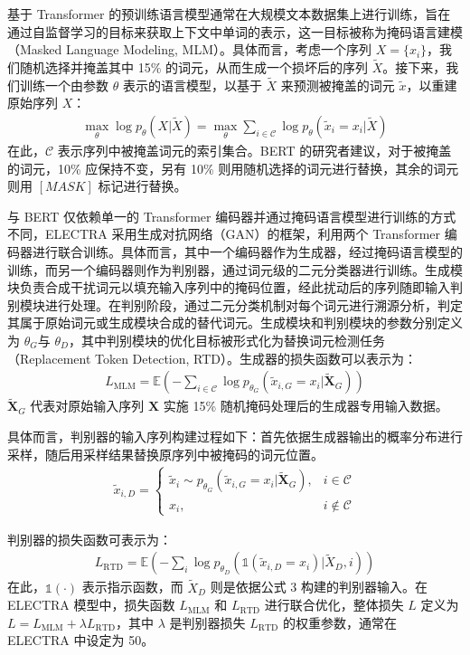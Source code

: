 基于 Transformer 的预训练语言模型通常在大规模文本数据集上进行训练，旨在通过自监督学习的目标来获取上下文中单词的表示，这一目标被称为掩码语言建模（Masked Language Modeling, MLM）\cite{devlin_bert_2019}。具体而言，考虑一个序列 \(X = \{x_i\}\)，我们随机选择并掩盖其中 15\% 的词元，从而生成一个损坏后的序列 \(\tilde{X}\)。接下来，我们训练一个由参数 \(\theta\) 表示的语言模型，以基于 \(\tilde{X}\) 来预测被掩盖的词元 \(\tilde{x}\)，以重建原始序列 \(X\)：
\begin{align}
\max_{\theta} \log p_{\theta}(X|\tilde{X}) = \max_{\theta} \sum_{i \in \mathcal{C}} \log p_{\theta}(\tilde{x}_i = x_i|\tilde{X})
\end{align}
在此，\(\mathcal{C}\) 表示序列中被掩盖词元的索引集合。BERT 的研究者建议，对于被掩盖的词元，10\% 应保持不变，另有 10\% 则用随机选择的词元进行替换，其余的词元则用 \([MASK]\) 标记进行替换。

与 BERT 仅依赖单一的 Transformer 编码器并通过掩码语言模型进行训练的方式不同，ELECTRA 采用生成对抗网络（GAN）的框架，利用两个 Transformer 编码器进行联合训练。具体而言，其中一个编码器作为生成器，经过掩码语言模型的训练，而另一个编码器则作为判别器，通过词元级的二元分类器进行训练。生成模块负责合成干扰词元以填充输入序列中的掩码位置，经此扰动后的序列随即输入判别模块进行处理。在判别阶段，通过二元分类机制对每个词元进行溯源分析，判定其属于原始词元或生成模块合成的替代词元。生成模块和判别模块的参数分别定义为 \(\theta_G\)​ 与 \(\theta_D\)​，其中判别模块的优化目标被形式化为替换词元检测任务（Replacement Token Detection, RTD）。生成器的损失函数可以表示为：
\begin{align} 
L_{\text{MLM}} = \mathbb{E} \left( - \sum_{i \in \mathcal{C}} \log p_{\theta_G}(\tilde{x}_{i,G} = x_i|\tilde{\mathbf{X}}_G) \right)
\end{align}
\(\tilde{\mathbf{X}}_G\) 代表对原始输入序列 \(\mathbf{X}\) 实施 15\% 随机掩码处理后的生成器专用输入数据。

具体而言，判别器的输入序列构建过程如下：首先依据生成器输出的概率分布进行采样，随后用采样结果替换原序列中被掩码的词元位置。
\begin{align} 
\tilde{x}_{i,D} = \begin{cases} \tilde{x}_{i} \sim p_{\theta_G}(\tilde{x}_{i,G} = x_i|\tilde{\mathbf{X}}_G), & i \in \mathcal{C} \\ x_i, & i \notin \mathcal{C} \end{cases}
\end{align}

判别器的损失函数可表示为：
\begin{align}
L_{\text{RTD}} = \mathbb{E} \left( - \sum_{i} \log p_{\theta_D} \left( \mathbb{1}(\tilde{x}_{i,D} = x_i)|\tilde{X}_D, i \right) \right) 
\end{align}
在此，\(\mathbb{1}(\cdot)\) 表示指示函数，而 \(\tilde{X}_D\) 则是依据公式 3 构建的判别器输入。在 ELECTRA 模型中，损失函数 \(L_{\text{MLM}}\) 和 \(L_{\text{RTD}}\) 进行联合优化，整体损失 \(L\) 定义为 \(L = L_{\text{MLM}} + \lambda L_{\text{RTD}}\)，其中 \(\lambda\) 是判别器损失 \(L_{\text{RTD}}\) 的权重参数，通常在 ELECTRA 中设定为 50。

